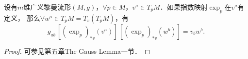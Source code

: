 \begin{theorem}\label{chgd:thm_Gauss-lemma}
    设有$m$维广义黎曼流形$(M,g)$，$\forall p\in M$，$v^a\in T_p M$．如果指数映射$\exp_p$在$v^a$有定义，
    那么$\forall w^a\in T_p M = T_v(T_p M)$，有
    \begin{equation}\label{chgd:eqn_Gauss-lemma}
        g_{ab} \, \left[(\exp_{p})_{*v}(v^a)\right] \,
        \left[(\exp_{p})_{*v}(w^b)\right] = v_b w^b .
    \end{equation}
\end{theorem}
\begin{proof}
	可参见\textcite{oneill1983}第五章The Gauss Lemma一节．
\end{proof}
